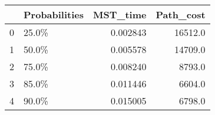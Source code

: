 \begin{tabular}{llrr}
\toprule
{} & Probabilities &  MST\_time &  Path\_cost \\
\midrule
0 &         25.0\% &  0.002843 &    16512.0 \\
1 &         50.0\% &  0.005578 &    14709.0 \\
2 &         75.0\% &  0.008240 &     8793.0 \\
3 &         85.0\% &  0.011446 &     6604.0 \\
4 &         90.0\% &  0.015005 &     6798.0 \\
\bottomrule
\end{tabular}
